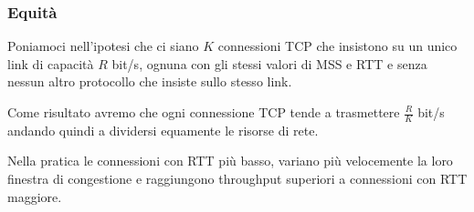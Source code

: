 \subsubsection{Equità}
Poniamoci nell'ipotesi che ci siano $K$ connessioni TCP che insistono su un unico link di capacità
$R$ bit/s, ognuna con gli stessi valori di MSS e RTT e senza nessun altro protocollo che insiste
sullo stesso link.

Come risultato avremo che ogni connessione TCP tende a trasmettere $\frac{R}{K}$ bit/s andando
quindi a dividersi equamente le risorse di rete.

Nella pratica le connessioni con RTT più basso, variano più velocemente la loro finestra di
congestione e raggiungono throughput superiori a connessioni con RTT maggiore.
